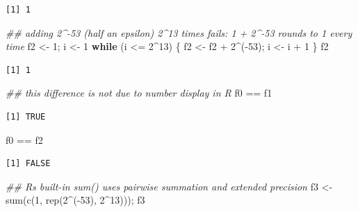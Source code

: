 \documentclass[
  letterpaper,
  DIV=11,
  numbers=noendperiod]{scrreprt}
\newenvironment{Shaded}{\begin{snugshade}}{\end{snugshade}}
\newcommand{\ControlFlowTok}[1]{\textcolor[rgb]{0.00,0.23,0.31}{\textbf{#1}}}
\newcommand{\DecValTok}[1]{\textcolor[rgb]{0.68,0.00,0.00}{#1}}
\newcommand{\DocumentationTok}[1]{\textcolor[rgb]{0.37,0.37,0.37}{\textit{#1}}}
\newcommand{\FunctionTok}[1]{\textcolor[rgb]{0.28,0.35,0.67}{#1}}
\newcommand{\NormalTok}[1]{\textcolor[rgb]{0.00,0.23,0.31}{#1}}
\newcommand{\OtherTok}[1]{\textcolor[rgb]{0.00,0.23,0.31}{#1}}
\newcommand{\SpecialCharTok}[1]{\textcolor[rgb]{0.37,0.37,0.37}{#1}}
\begin{document}
\begin{verbatim}
[1] 1
\end{verbatim}

\begin{Shaded}
\begin{Highlighting}[]
\DocumentationTok{\#\# adding 2\^{}{-}53 (half an epsilon) 2\^{}13 times fails: 1 + 2\^{}{-}53 rounds to 1 every time}
\NormalTok{f2 }\OtherTok{\textless{}{-}} \DecValTok{1}\NormalTok{; i }\OtherTok{\textless{}{-}} \DecValTok{1}
\ControlFlowTok{while}\NormalTok{ (i }\SpecialCharTok{\textless{}=} \DecValTok{2}\SpecialCharTok{\^{}}\DecValTok{13}\NormalTok{) \{ f2 }\OtherTok{\textless{}{-}}\NormalTok{ f2 }\SpecialCharTok{+} \DecValTok{2}\SpecialCharTok{\^{}}\NormalTok{(}\SpecialCharTok{{-}}\DecValTok{53}\NormalTok{); i }\OtherTok{\textless{}{-}}\NormalTok{ i }\SpecialCharTok{+} \DecValTok{1}\NormalTok{ \}}
\NormalTok{f2}
\end{Highlighting}
\end{Shaded}

\begin{verbatim}
[1] 1
\end{verbatim}

\begin{Shaded}
\begin{Highlighting}[]
\DocumentationTok{\#\# this difference is not due to number display in R}
\NormalTok{f0 }\SpecialCharTok{==}\NormalTok{ f1}
\end{Highlighting}
\end{Shaded}

\begin{verbatim}
[1] TRUE
\end{verbatim}

\begin{Shaded}
\begin{Highlighting}[]
\NormalTok{f0 }\SpecialCharTok{==}\NormalTok{ f2}
\end{Highlighting}
\end{Shaded}

\begin{verbatim}
[1] FALSE
\end{verbatim}

\begin{Shaded}
\begin{Highlighting}[]
\DocumentationTok{\#\# R\textquotesingle{}s built{-}in sum() uses pairwise summation and extended precision}
\NormalTok{f3 }\OtherTok{\textless{}{-}} \FunctionTok{sum}\NormalTok{(}\FunctionTok{c}\NormalTok{(}\DecValTok{1}\NormalTok{, }\FunctionTok{rep}\NormalTok{(}\DecValTok{2}\SpecialCharTok{\^{}}\NormalTok{(}\SpecialCharTok{{-}}\DecValTok{53}\NormalTok{), }\DecValTok{2}\SpecialCharTok{\^{}}\DecValTok{13}\NormalTok{))); f3}
\end{Highlighting}
\end{Shaded}
\end{document}
